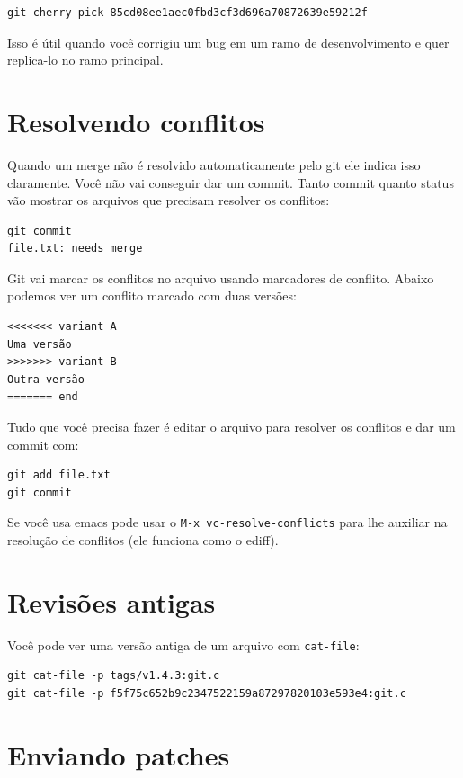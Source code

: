\documentclass[12pt,brazil]{book}
\begin{document}
\begin{verbatim}
git cherry-pick 85cd08ee1aec0fbd3cf3d696a70872639e59212f
\end{verbatim}

Isso é útil quando você corrigiu um bug em um ramo de desenvolvimento
e quer replica-lo no ramo principal.

\section{Resolvendo conflitos}
\label{sec:resolvendo-conflitos}

Quando um merge não é resolvido automaticamente pelo git ele indica
isso claramente. Você não vai conseguir dar um commit. Tanto commit
quanto status vão mostrar os arquivos que precisam resolver os
conflitos:

\begin{verbatim}
git commit
file.txt: needs merge
\end{verbatim}

Git vai marcar os conflitos no arquivo usando marcadores de conflito.
Abaixo podemos ver um conflito marcado com duas versões:

\begin{verbatim}
<<<<<<< variant A
Uma versão
>>>>>>> variant B
Outra versão
======= end
\end{verbatim}

Tudo que você precisa fazer é editar o arquivo para resolver os
conflitos e dar um commit com:

\begin{verbatim}
git add file.txt
git commit
\end{verbatim}

Se você usa emacs pode usar o \texttt{M-x vc-resolve-conflicts} para
lhe auxiliar na resolução de conflitos (ele funciona como o ediff).

\section{Revisões antigas}
\label{sec:revisoes-antigas}

Você pode ver uma versão antiga de um arquivo com \texttt{cat-file}:

\begin{verbatim}
git cat-file -p tags/v1.4.3:git.c
git cat-file -p f5f75c652b9c2347522159a87297820103e593e4:git.c
\end{verbatim}

\section{Enviando patches}
\label{sec:enviando-patches}
\end{document}
